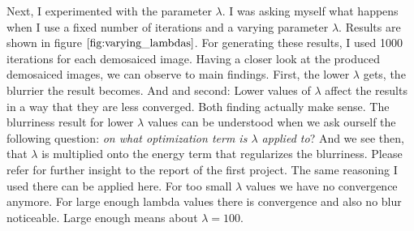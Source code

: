 \documentclass{paper}
\begin{document}
Next, I experimented with the parameter $\lambda$. I was asking myself what happens when I use a fixed number of iterations and a varying parameter $\lambda$. Results are shown in figure $\ref{fig:varying_lambdas}$. For generating these results, I used 1000 iterations for each demosaiced image. Having a closer look at the produced demosaiced images, we can observe to main findings. First, the lower $\lambda$ gets, the blurrier the result becomes. And and second: Lower values of $\lambda$ affect the results in a way that they are less converged. Both finding actually make sense. The blurriness result for lower $\lambda$ values can be understood when we ask ourself the following question: \emph{on what optimization term is $\lambda$ applied to}? And we see then, that $\lambda$ is multiplied onto the energy term that regularizes the blurriness. Please refer for further insight to the report of the first project. The same reasoning I used there can be applied here. For too small $\lambda$ values we have no convergence anymore. For large enough lambda values there is convergence and also no blur noticeable. Large enough means about $\lambda = 100$.
\end{document}
